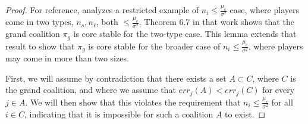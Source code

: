 \documentclass{article}
\newcommand{\mue}[0]{\ensuremath{\mu_e}}
\newcommand{\var}[0]{\ensuremath{\sigma^2}}
\newcommand{\ndraw}[0]{\ensuremath{n}}
\newcommand{\gcol}[0]{\ensuremath{\pi_g}}
\newcommand{\s}[0]{\ensuremath{s}}
\newcommand{\el}[0]{\ensuremath{\ell}}
\newcommand{\ns}[0]{\ensuremath{n_{\s}}}
\newcommand{\nlv}[0]{\ensuremath{n_{\el}}}
\newcommand{\col}[0]{\ensuremath{C}}
\newcommand{\colA}[0]{\ensuremath{A}}
\begin{document}
\gcolcore*
\begin{proof}
For reference, \cite{donahue2020model} analyzes a restricted example of $\ndraw_i \leq \frac{\mue}{\var}$ case, where players come in two types, $\ns, \nlv$, both $\leq \frac{\mue}{\var}$. Theorem 6.7 in that work shows that the grand coalition $\gcol$ is core stable for the two-type case. This lemma extends that result to show that $\gcol$ is core stable for the broader case of $\ndraw_i \leq \frac{\mue}{\var}$, where players may come in more than two sizes.

First, we will assume by contradiction that there exists a set $\colA \subset \col$, where $\col$ is the grand coalition, and where we assume that $err_j(\colA) < err_j(\col)$ for every $j \in \colA$. We will then show that this violates the requirement that $\ndraw_i \leq \frac{\mue}{\var}$ for all $i \in \col$, indicating that it is impossible for such a coalition $\colA$ to exist. 


\end{proof}
\end{document}
